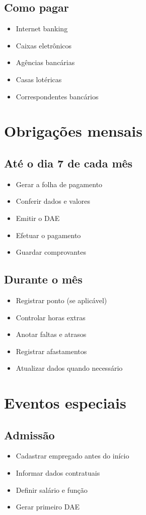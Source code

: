 \documentclass[12pt,a4paper]{article}
\begin{document}
\subsection{Como pagar}
\begin{itemize}
    \item Internet banking
    \item Caixas eletrônicos
    \item Agências bancárias
    \item Casas lotéricas
    \item Correspondentes bancários
\end{itemize}

\section{Obrigações mensais}

\subsection{Até o dia 7 de cada mês}
\begin{itemize}
    \item Gerar a folha de pagamento
    \item Conferir dados e valores
    \item Emitir o DAE
    \item Efetuar o pagamento
    \item Guardar comprovantes
\end{itemize}

\subsection{Durante o mês}
\begin{itemize}
    \item Registrar ponto (se aplicável)
    \item Controlar horas extras
    \item Anotar faltas e atrasos
    \item Registrar afastamentos
    \item Atualizar dados quando necessário
\end{itemize}

\section{Eventos especiais}

\subsection{Admissão}
\begin{itemize}
    \item Cadastrar empregado antes do início
    \item Informar dados contratuais
    \item Definir salário e função
    \item Gerar primeiro DAE
\end{itemize}
\end{document}
